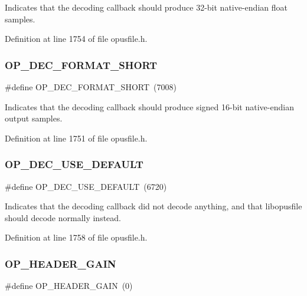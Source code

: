 Indicates that the decoding callback should produce 32-\/bit native-\/endian float samples. 

Definition at line 1754 of file opusfile.\+h.

\mbox{\label{group__stream__decoding_ga55ed1cb616d856a47d618fa099c742aa}} 
\subsubsection{\texorpdfstring{OP\_DEC\_FORMAT\_SHORT}{OP\_DEC\_FORMAT\_SHORT}}
{\footnotesize\ttfamily \#define O\+P\+\_\+\+D\+E\+C\+\_\+\+F\+O\+R\+M\+A\+T\+\_\+\+S\+H\+O\+RT~(7008)}

Indicates that the decoding callback should produce signed 16-\/bit native-\/endian output samples. 

Definition at line 1751 of file opusfile.\+h.

\mbox{\label{group__stream__decoding_gaf421eba19d82d5b0c170b548b8ff79f1}} 
\subsubsection{\texorpdfstring{OP\_DEC\_USE\_DEFAULT}{OP\_DEC\_USE\_DEFAULT}}
{\footnotesize\ttfamily \#define O\+P\+\_\+\+D\+E\+C\+\_\+\+U\+S\+E\+\_\+\+D\+E\+F\+A\+U\+LT~(6720)}

Indicates that the decoding callback did not decode anything, and that {\ttfamily libopusfile} should decode normally instead. 

Definition at line 1758 of file opusfile.\+h.

\mbox{\label{group__stream__decoding_ga846edba35e7470251a6a95b1e2364855}} 
\subsubsection{\texorpdfstring{OP\_HEADER\_GAIN}{OP\_HEADER\_GAIN}}
{\footnotesize\ttfamily \#define O\+P\+\_\+\+H\+E\+A\+D\+E\+R\+\_\+\+G\+A\+IN~(0)}

